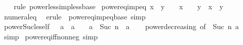 \begin{isabellebody}
%
\isadelimproof
\ \ %
\endisadelimproof
%
\isatagproof
{}\isamarkupfalse%
\ {\isacharparenleft}{\kern0pt}rule\ power{\isacharunderscore}{\kern0pt}less{\isacharunderscore}{\kern0pt}imp{\isacharunderscore}{\kern0pt}less{\isacharunderscore}{\kern0pt}base{\isacharparenright}{\kern0pt}%
\endisatagproof
{\isafoldproof}%
%
\isadelimproof
\isanewline
%
\endisadelimproof
\isanewline
{}\isamarkupfalse%
\ power{}{\isacharunderscore}{\kern0pt}eq{\isacharunderscore}{\kern0pt}imp{\isacharunderscore}{\kern0pt}eq{\isacharcolon}{\kern0pt}\ {\isachardoublequoteopen}x\ {\isacharequal}{\kern0pt}\ y\ {\isasymLongrightarrow}\ {}\ {\isasymle}\ x\ {\isasymLongrightarrow}\ {}\ {\isasymle}\ y\ {\isasymLongrightarrow}\ x\ {\isacharequal}{\kern0pt}\ y{\isachardoublequoteclose}\isanewline
%
\isadelimproof
\ \ %
\endisadelimproof
%
\isatagproof
{}\isamarkupfalse%
\ numeral{\isacharunderscore}{\kern0pt}{}{\isacharunderscore}{\kern0pt}eq{\isacharunderscore}{\kern0pt}{}\ \isamarkupfalse%
\ {\isacharparenleft}{\kern0pt}erule\ {\isacharparenleft}{\kern0pt}{}{\isacharparenright}{\kern0pt}\ power{\isacharunderscore}{\kern0pt}eq{\isacharunderscore}{\kern0pt}imp{\isacharunderscore}{\kern0pt}eq{\isacharunderscore}{\kern0pt}base{\isacharparenright}{\kern0pt}\ simp%
\endisatagproof
{\isafoldproof}%
%
\isadelimproof
\isanewline
%
\endisadelimproof
\isanewline
{}\isamarkupfalse%
\ power{\isacharunderscore}{\kern0pt}Suc{\isacharunderscore}{\kern0pt}le{\isacharunderscore}{\kern0pt}self{\isacharcolon}{\kern0pt}\ {\isachardoublequoteopen}{}\ {\isasymle}\ a\ {\isasymLongrightarrow}\ a\ {\isasymle}\ {}\ {\isasymLongrightarrow}\ a\ {\isacharcircum}{\kern0pt}\ Suc\ n\ {\isasymle}\ a{\isachardoublequoteclose}\isanewline
%
\isadelimproof
\ \ %
\endisadelimproof
%
\isatagproof
{}\isamarkupfalse%
\ power{\isacharunderscore}{\kern0pt}decreasing\ {\isacharbrackleft}{\kern0pt}of\ {}\ {\isachardoublequoteopen}Suc\ n{\isachardoublequoteclose}\ a{\isacharbrackright}{\kern0pt}\ \isamarkupfalse%
\ simp%
\endisatagproof
{\isafoldproof}%
%
\isadelimproof
\isanewline
%
\endisadelimproof
\isanewline
{}\isamarkupfalse%
\ power{}{\isacharunderscore}{\kern0pt}eq{\isacharunderscore}{\kern0pt}iff{\isacharunderscore}{\kern0pt}nonneg\ {\isacharbrackleft}{\kern0pt}simp{\isacharbrackright}{\kern0pt}{\isacharcolon}{\kern0pt}\isanewline

\end{isabellebody}

